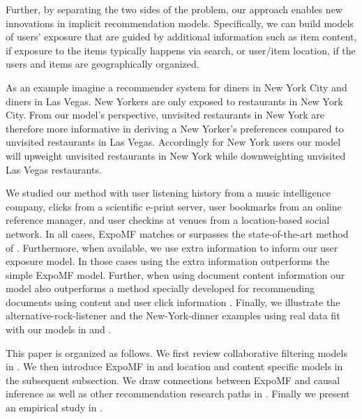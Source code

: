 Further, by separating the two sides of the problem, our approach
enables new innovations in implicit recommendation
models. Specifically, we can build models of users' exposure that
are guided by additional information such as item content, if
exposure to the items typically happens via search, or user/item
location, if the users and items are geographically organized.  

As an example imagine a recommender system for diners in New York City and
diners in Las Vegas. New Yorkers are only exposed to restaurants in New York City.
From our model's perspective, unvisited restaurants in New York are therefore more 
informative in deriving a New Yorker's preferences compared to unvisited 
restaurants in Las Vegas. Accordingly for New York users our model will
upweight unvisited restaurants in New York while downweighting unvisited
Las Vegas restaurants. 

We studied our method with user listening history from a music intelligence company, clicks from a scientific e-print server, user
bookmarks from an online reference manager, and user checkins at venues from a 
location-based social network. In all cases, ExpoMF matches or surpasses
the state-of-the-art method of \citet{hu2008collaborative}. Furthermore, when
available, we use extra information to inform our user exposure model. In those
cases using the extra information outperforms the simple ExpoMF model.
Further, when using document content information our model also
outperforms a method specially developed for recommending documents using content and user click information 
\cite{wang2011collaborative}. Finally, we illustrate the
alternative-rock-listener and the New-York-dinner examples using real data fit 
with our models in  and . 




This paper is organized as follows. We first review collaborative filtering models in . We
then introduce ExpoMF in  and location and content
specific models in the subsequent subsection. We draw connections between ExpoMF and causal inference as well as other recommendation research paths in
. Finally we present an empirical study in
.

